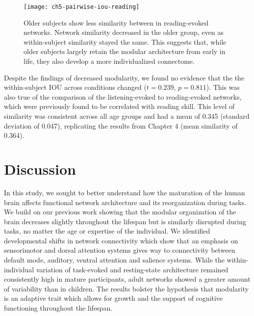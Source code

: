 \begin{figure}[t]
	\centering
	\texttt{[image: ch5-pairwise-iou-reading]}
    \caption[Older subjects show less similarity between in reading-evoked networks]{Older subjects show less similarity between in reading-evoked networks. Network similarity decreased in the older group, even as within-subject similarity stayed the same. This suggests that, while older subjects largely retain the modular architecture from early in life, they also develop a more individualized connectome.}
	\label{fig:ch5-pairwise-iou-reading}
\end{figure}

Despite the findings of decreased modularity, we found no evidence that the the within-subject IOU across conditions changed ($t = 0.239$, $p = 0.811$). This was also true of the comparison of the listening-evoked to reading-evoked networks, which were previously found to be correlated with reading skill. This level of similarity was consistent across all age groups and had a mean of 0.345 (standard deviation of 0.047), replicating the results from Chapter 4 (mean similarity of 0.364).

\section{Discussion}

In this study, we sought to better understand how the maturation of the human brain affects functional network architecture and its reorganization during tasks. We build on our previous work showing that the modular organization of the brain decreases slightly throughout the lifespan but is similarly disrupted during tasks, no matter the age or expertise of the individual. We identified developmental shifts in network connectivity which show that an emphasis on sensorimotor and dorsal attention systems gives way to connectivity between default mode, auditory, ventral attention and salience systems. While the within-individual variation of task-evoked and resting-state architecture remained consistently high in mature participants, adult networks showed a greater amount of variability than in children. The results bolster the hypothesis that modularity is an adaptive trait which allows for growth and the support of cognitive functioning throughout the lifespan.

